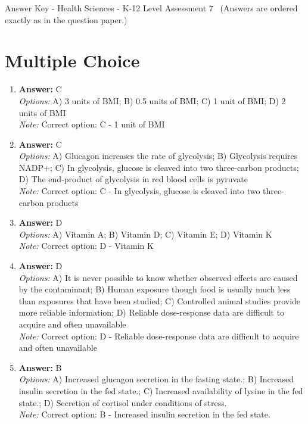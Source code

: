 \documentclass[12pt]{article}
\begin{document}
\begin{center}
Answer Key - Health Sciences - K-12 Level Assessment 7 \
\small (Answers are ordered exactly as in the question paper.)
\end{center}

\section*{Multiple Choice}
\begin{enumerate}[label=\arabic*.]
\item \textbf{Answer:} C
\\ \textit{Options:} A) 3 units of BMI; B) 0.5 units of BMI; C) 1 unit of BMI; D) 2 units of BMI
\\ \textit{Note:} Correct option: C - 1 unit of BMI
\item \textbf{Answer:} C
\\ \textit{Options:} A) Glucagon increases the rate of glycolysis; B) Glycolysis requires NADP+; C) In glycolysis, glucose is cleaved into two three-carbon products; D) The end-product of glycolysis in red blood cells is pyruvate
\\ \textit{Note:} Correct option: C - In glycolysis, glucose is cleaved into two three-carbon products
\item \textbf{Answer:} D
\\ \textit{Options:} A) Vitamin A; B) Vitamin D; C) Vitamin E; D) Vitamin K
\\ \textit{Note:} Correct option: D - Vitamin K
\item \textbf{Answer:} D
\\ \textit{Options:} A) It is never possible to know whether observed effects are caused by the contaminant; B) Human exposure though food is usually much less than exposures that have been studied; C) Controlled animal studies provide more reliable information; D) Reliable dose-response data are difficult to acquire and often unavailable
\\ \textit{Note:} Correct option: D - Reliable dose-response data are difficult to acquire and often unavailable
\item \textbf{Answer:} B
\\ \textit{Options:} A) Increased glucagon secretion in the fasting state.; B) Increased insulin secretion in the fed state.; C) Increased availability of lysine in the fed state.; D) Secretion of cortisol under conditions of stress.
\\ \textit{Note:} Correct option: B - Increased insulin secretion in the fed state.
\end{enumerate}
\end{document}
